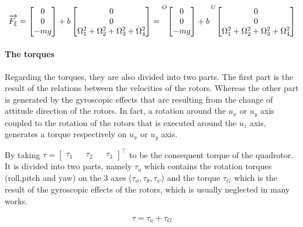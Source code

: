 \documentclass{thesisreport}
\begin{document}
\begin{equation}
\overrightarrow{F_{\xi}}  = \begin{bmatrix}
0 \\
0 \\
-mg \\
\end{bmatrix} 
+ 
b \begin{bmatrix}
0 \\ 
0 \\
\Omega_1^2 + \Omega_2^2 + \Omega_3^2 + \Omega_4^2\\
\end{bmatrix}=
\prescript{O}{}{\begin{bmatrix}
0 \\
0 \\
-mg \\
\end{bmatrix}}
+ b \prescript{U}{}{\begin{bmatrix}
0 \\ 
0 \\
\Omega_1^2 + \Omega_2^2 + \Omega_3^2 + \Omega_4^2\\
\end{bmatrix}}
\end{equation}

\paragraph{The torques}
Regarding the torques, they are also divided into two parts. The first part is the result of the relations between the velocities of the rotors. Whereas the other part is generated by the gyroscopic effects that are resulting from the change of attitude direction of the rotors. In fact, a rotation around the $u_x$ or $u_y$ axis coupled to the rotation of the rotors that is executed around the $u_z$ axis, generates a torque respectively on $u_x$ or $u_y$ axis.

By taking $\tau=\begin{bmatrix}
\tau_1 && \tau_2 && \tau_3 
\end{bmatrix}^{\intercal}$ to be the consequent torque of the quadrotor. It is divided into two parts, namely $\tau_a$ which contains the rotation torques (roll,pitch and yaw) on the 3 axes ($\tau_{\phi}, \tau_{\theta}, \tau_{\psi}$) and the torque $\tau_G$ which is the result of the gyroscopic effects of the rotors, which is usually neglected in many works.

\begin{equation}
	\tau = \tau_a + \tau_G
\end{equation}
\end{document}
